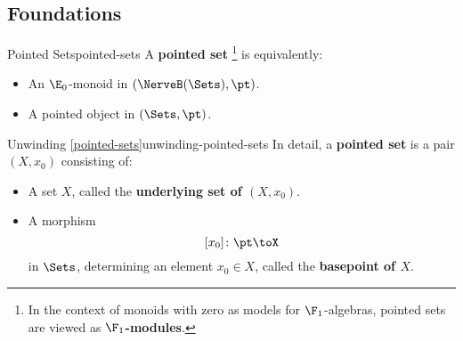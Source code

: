 \subsection{Foundations}\label{subsection-pointed-sets-foundations}
\begin{definition}{Pointed Sets}{pointed-sets}%
    A \textbf{pointed set}%
    \footnote{%
        In the context of monoids with zero as models for $\F_{1}$-algebras, pointed sets are viewed as \textbf{$\F_{1}$-modules}.
        \par\vspace*{\TCBBoxCorrection}
    } %
    is equivalently:
    \begin{itemize}
        \item An $\E_{0}$-monoid in $(\NerveB(\Sets),\pt)$.
        \item A pointed object in $(\Sets,\pt)$.%
    \end{itemize}
\end{definition}
\begin{remark}{Unwinding \cref{pointed-sets}}{unwinding-pointed-sets}%
    In detail, a \textbf{pointed set} is a pair $(X,x_{0})$ consisting of:
    \begin{itemize}
        \item{}A set $X$, called the \textbf{underlying set of $(X,x_{0})$}.
        \item{}A morphism
            \[
                [x_{0}]%
                \colon%
                \pt%
                \to%
                X%
            \]%
            in $\Sets$, determining an element $x_{0}\in X$, called the \textbf{basepoint of $X$}.
    \end{itemize}
\end{remark}

